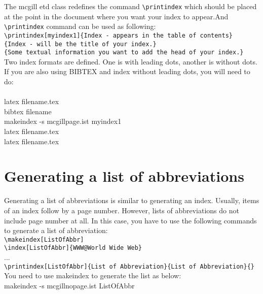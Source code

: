 \documentclass[12pt,Bold,letterpaper,TexShade]{mcgilletdclass}
\begin{document}
The mcgill etd class redefines the command \verb=\printindex= which should be placed at the point %
in the document where you want your index to appear.And \verb=\printindex= command can be used as following:\\%
  \verb=\printindex[myindex1]{Index - appears in the table of contents}=\\%
  \verb={Index - will be the title of your index.}= \\%
  \verb={Some textual information you want to add the head of your index.}=\\%

Two index formats are defined. One is with leading dots, another is without dots.
If you are also using BIBTEX and index without leading dots, you will need to do:\\
\\
latex filename.tex\\
bibtex filename\\
makeindex -s mcgillpage.ist myindex1 \\
latex filename.tex\\
latex filename.tex\\

\section{Generating a list of abbreviations}
Generating a list of abbreviations is similar to generating an index. Usually, items of an index 
follow by a page number. However, lists of abbreviations do not include page number at all. In this
case, you have to use the following commands to generate a list of abbreviation:\\
	\verb=\makeindex[ListOfAbbr]=\\
	\verb=\index[ListOfAbbr]{WWW@World Wide Web}=\\
	...\\
	\verb=\printindex[ListOfAbbr]{List of Abbreviation}{List of Abbreviation}{}=\\
	
	You need to use makeindex to generate the list as below: \\
	makeindex -s mcgillnopage.ist ListOfAbbr \\
	
	
\end{document}
